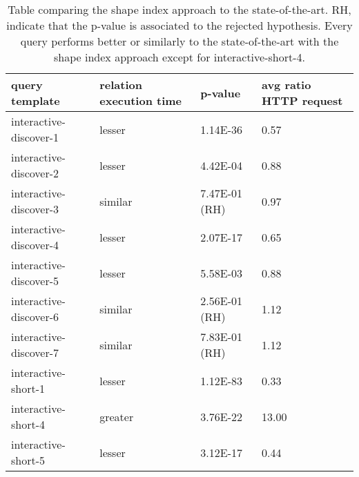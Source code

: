 \begin{table}
	\begin{center}
		\begin{tabular}{|l|l|l|l|}
			\hline
			query template & relation execution time & p-value & avg ratio HTTP request \\
			\hline
			interactive-discover-1 & lesser & 1.14E-36 & 0.57 \\
			\hline
			interactive-discover-2 & lesser & 4.42E-04 & 0.88 \\
			\hline
			interactive-discover-3 & similar & 7.47E-01 (RH) & 0.97 \\
			\hline
			interactive-discover-4 & lesser & 2.07E-17 & 0.65 \\
			\hline
			interactive-discover-5 & lesser & 5.58E-03 & 0.88 \\
			\hline
			interactive-discover-6 & similar & 2.56E-01 (RH) & 1.12 \\
			\hline
			interactive-discover-7 & similar & 7.83E-01 (RH) & 1.12 \\
			\hline
			interactive-short-1 & lesser & 1.12E-83 & 0.33 \\
			\hline
			interactive-short-4 & greater & 3.76E-22 & 13.00 \\
			\hline
			interactive-short-5 & lesser & 3.12E-17 & 0.44 \\
			\hline
		\end{tabular}
	\end{center}
	\caption{Table comparing the shape index approach to the state-of-the-art. RH, indicate that the p-value is associated to the rejected hypothesis. Every query performs better or similarly to the state-of-the-art with the shape index approach except for interactive-short-4.}
	\label{tab:statSignificanceStateOfTheArt}
\end{table}
